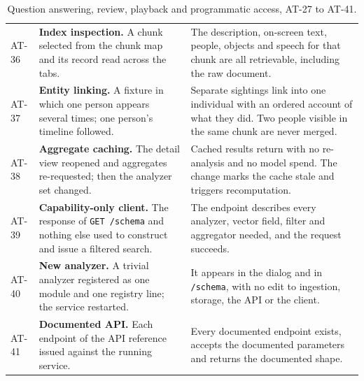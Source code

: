 \documentclass[11pt,a4paper]{article}
\begin{document}
\begin{table}[htbp]
\begin{tabularx}{\textwidth}{@{}L{0.85cm}XX@{}}
AT-36 & \textbf{Index inspection.} A chunk selected from the chunk map and its record read across the tabs. & The description, on-screen text, people, objects and speech for that chunk are all retrievable, including the raw document. \\
AT-37 & \textbf{Entity linking.} A fixture in which one person appears several times; one person's timeline followed. & Separate sightings link into one individual with an ordered account of what they did. Two people visible in the same chunk are never merged. \\
AT-38 & \textbf{Aggregate caching.} The detail view reopened and aggregates re-requested; then the analyzer set changed. & Cached results return with no re-analysis and no model spend. The change marks the cache stale and triggers recomputation. \\
AT-39 & \textbf{Capability-only client.} The response of \texttt{GET /schema} and nothing else used to construct and issue a filtered search. & The endpoint describes every analyzer, vector field, filter and aggregator needed, and the request succeeds. \\
AT-40 & \textbf{New analyzer.} A trivial analyzer registered as one module and one registry line; the service restarted. & It appears in the dialog and in \texttt{/schema}, with no edit to ingestion, storage, the API or the client. \\
AT-41 & \textbf{Documented API.} Each endpoint of the API reference issued against the running service. & Every documented endpoint exists, accepts the documented parameters and returns the documented shape. \\
\bottomrule
\end{tabularx}
\caption{Question answering, review, playback and programmatic access, AT-27 to
AT-41.}
\end{table}
\end{document}
